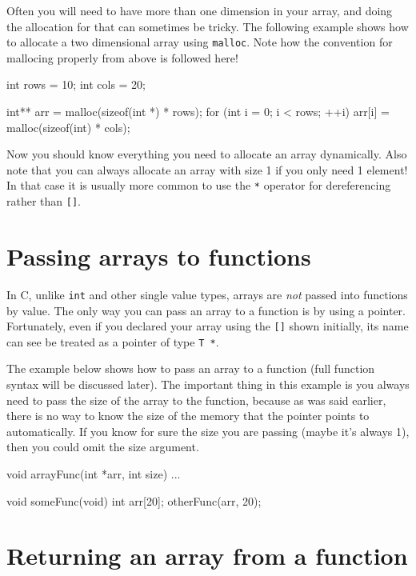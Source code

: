 Often you will need to have more than one dimension in your array, and doing the allocation for that can sometimes be tricky.
The following example shows how to allocate a two dimensional array using \texttt{malloc}.
Note how the convention for mallocing properly from above is followed here! 

\begin{codeblock}
int rows = 10;
int cols = 20;

int** arr = malloc(sizeof(int *) * rows);
for (int i = 0; i < rows; ++i) {
    arr[i] = malloc(sizeof(int) * cols);
}
\end{codeblock}

Now you should know everything you need to allocate an array dynamically.
Also note that you can always allocate an array with size 1 if you only need 1 element!
In that case it is usually more common to use the \texttt{*} operator for dereferencing rather than \texttt{[]}.

\section{Passing arrays to functions}

In C, unlike \texttt{int} and other single value types, arrays are \emph{not} passed into functions by value.
The only way you can pass an array to a function is by using a pointer.
Fortunately, even if you declared your array using the \texttt{[]} shown initially, its name can see be treated as a pointer of type \texttt{T *}.

The example below shows how to pass an array to a function (full function syntax will be discussed later).
The important thing in this example is you always need to pass the size of the array to the function, because as was said earlier, there is no way to know the size of the memory that the pointer points to automatically.
If you know for sure the size you are passing (maybe it's always 1), then you could omit the size argument.

\begin{codeblock}
void arrayFunc(int *arr, int size)
{
    ...
}


void someFunc(void)
{
    int arr[20];
    otherFunc(arr, 20);
}
\end{codeblock}

\section{Returning an array from a function}

